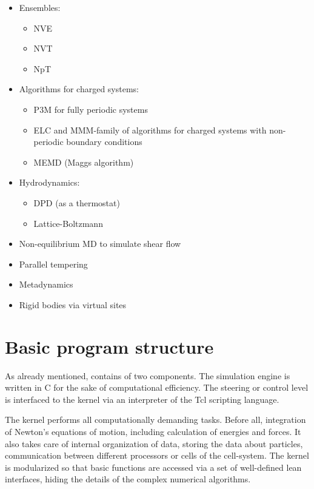 \begin{itemize}
\item Ensembles: 
  \begin{itemize} 
  \item NVE
  \item NVT
  \item NpT
  \end{itemize}
\item Algorithms for charged systems:
  \begin{itemize}
  \item P3M for fully periodic systems
  \item ELC and MMM-family of algorithms for charged systems with
    non-periodic boundary conditions
  \item MEMD (Maggs algorithm)
  \end{itemize}
\item Hydrodynamics:
  \begin{itemize}
  \item DPD (as a thermostat)
  \item Lattice-Boltzmann
  \end{itemize}
\item Non-equilibrium MD to simulate shear flow
\item Parallel tempering
\item Metadynamics
\item Rigid bodies via virtual sites
\end{itemize}

\section{Basic program structure}
\label{sec:structure}

As already mentioned, \es contains of two components.
The simulation engine is written in C for the sake
of computational efficiency. The steering or control
level is interfaced to the kernel via an interpreter 
of the Tcl scripting language.

The kernel performs all computationally demanding tasks. Before all,
integration of Newton's equations of motion, including calculation
of energies and forces. It also takes care of internal organization 
of data, storing the data about particles, communication between 
different processors or cells of the cell-system. The kernel is modularized
so that basic functions are accessed via a set of well-defined
lean interfaces, hiding the details of the complex numerical
algorithms.

